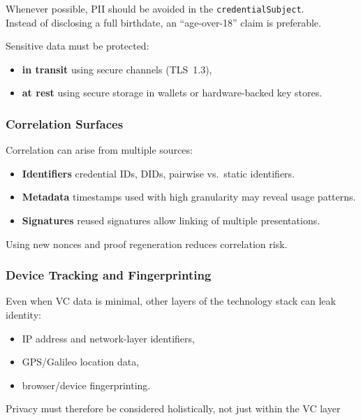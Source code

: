 Whenever possible, PII should be avoided in the \texttt{credentialSubject}.\\
Instead of disclosing a full birthdate, an ``age-over-18'' claim is preferable.
\medskip

\noindent
Sensitive data must be protected:

\begin{itemize}
    \item \textbf{in transit} using secure channels (TLS~1.3),
    \item \textbf{at rest} using secure storage in wallets or hardware-backed key stores.
\end{itemize}

\subsubsection *{Correlation Surfaces}

Correlation can arise from multiple sources:

\begin{itemize}
    \item \textbf{Identifiers} credential IDs, DIDs, pairwise vs.\ static identifiers.
    \item \textbf{Metadata} timestamps used with high granularity may reveal usage patterns.
    \item \textbf{Signatures} reused signatures allow linking of multiple presentations.
\end{itemize}

\noindent
Using new nonces and proof regeneration reduces correlation risk.

\subsubsection *{Device Tracking and Fingerprinting}

Even when VC data is minimal, other layers of the technology stack can leak identity:

\begin{itemize}
    \item IP address and network-layer identifiers,
    \item GPS/Galileo location data,
    \item browser/device fingerprinting.
\end{itemize}

\noindent
Privacy must therefore be considered holistically, not just within the VC layer

